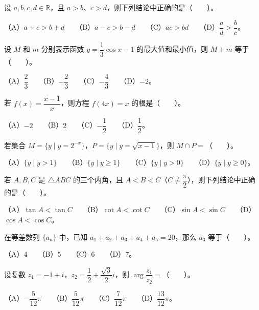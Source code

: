 \begin{question}
设 $a,b,c,d\in\mathbb{R}$，且 $a>b$、$c>d$，则下列结论中正确的是\mbox{（　　）}。

（A）$a+c>b+d$　　（B）$a-c>b-d$　　（C）$ac>bd$　　（D）$\dfrac{a}{d}>\dfrac{b}{c}$。

\end{question}
\begin{question}
设 $M$ 和 $m$ 分别表示函数 $y=\dfrac13\cos x-1$ 的最大值和最小值，则 $M+m$ 等于\mbox{（　　）}。

（A）$\dfrac23$　　（B）$-\dfrac23$　　（C）$-\dfrac43$　　（D）$-2$。

\end{question}
\begin{question}
若 $f(x)=\dfrac{x-1}{x}$，则方程 $f(4x)=x$ 的根是\mbox{（　　）}。

（A）$-2$　　（B）$2$　　（C）$-\dfrac12$　　（D）$\dfrac12$。

\end{question}
\begin{question}
若集合 $M=\{y\mid y=2^{-x}\}$，$P=\{y\mid y=\sqrt{x-1}\}$，则 $M\cap P=$\mbox{（　　）}。

（A）$\{y\mid y>1\}$　　（B）$\{y\mid y\ge1\}$　　（C）$\{y\mid y>0\}$　　（D）$\{y\mid y\ge0\}$。

\end{question}
\begin{question}
若 $A,B,C$ 是 $\triangle ABC$ 的三个内角，且 $A<B<C$（$C\ne\dfrac\pi2$），则下列结论中正确的是\mbox{（　　）}。

（A）$\tan A<\tan C$　　（B）$\cot A<\cot C$　　（C）$\sin A<\sin C$　　（D）$\cos A<\cos C$。

\end{question}
\begin{question}
在等差数列 $\{a_n\}$ 中，已知 $a_1+a_2+a_3+a_4+a_5=20$，那么 $a_3$ 等于\mbox{（　　）}。

（A）$4$　　（B）$5$　　（C）$6$　　（D）$7$。

\end{question}
\begin{question}
设复数 $z_1=-1+i$，$z_2=\dfrac12+\dfrac{\sqrt3}{2}i$，则 $\arg\dfrac{z_1}{z_2}=$\mbox{（　　）}。

（A）$-\dfrac5{12}\pi$　　（B）$\dfrac5{12}\pi$　　（C）$\dfrac7{12}\pi$　　（D）$\dfrac{13}{12}\pi$。

\end{question}
